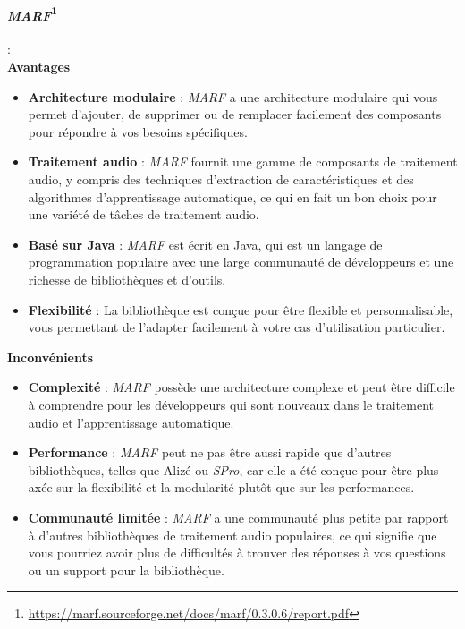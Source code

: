 \paragraph*{\textbf{\textit{MARF}}\footnote{\url{https://marf.sourceforge.net/docs/marf/0.3.0.6/report.pdf}}}:\\


\textbf{Avantages}
\begin{itemize}
    \item \textbf{Architecture modulaire} : \textit{MARF} a une architecture modulaire qui vous permet d'ajouter, de supprimer ou de remplacer facilement des composants
          pour répondre à vos besoins spécifiques.
    \item \textbf{Traitement audio} : \textit{MARF} fournit une gamme de composants de traitement audio, y compris des techniques d'extraction de caractéristiques et des
          algorithmes d'apprentissage automatique, ce qui en fait un bon choix pour une variété de tâches de traitement audio.
    \item \textbf{Basé sur Java} : \textit{MARF} est écrit en Java, qui est un langage de programmation populaire avec une large communauté de développeurs et une richesse
          de bibliothèques et d'outils.
    \item \textbf{Flexibilité} : La bibliothèque est conçue pour être flexible et personnalisable, vous permettant de l'adapter facilement à votre cas d'utilisation particulier.
\end{itemize}


\textbf{Inconvénients}
\begin{itemize}
    \item \textbf{Complexité} : \textit{MARF} possède une architecture complexe et peut être difficile à comprendre pour les développeurs qui sont nouveaux dans le traitement audio
          et l'apprentissage automatique.
    \item \textbf{Performance} : \textit{MARF} peut ne pas être aussi rapide que d'autres bibliothèques, telles que Alizé ou \textit{SPro}, car elle a été conçue pour être
          plus axée sur la flexibilité et la modularité plutôt que sur les performances.
    \item \textbf{Communauté limitée} : \textit{MARF} a une communauté plus petite par rapport à d'autres bibliothèques de traitement audio populaires, ce qui signifie que
          vous pourriez avoir plus de difficultés à trouver des réponses à vos questions ou un support pour la bibliothèque.
\end{itemize}

